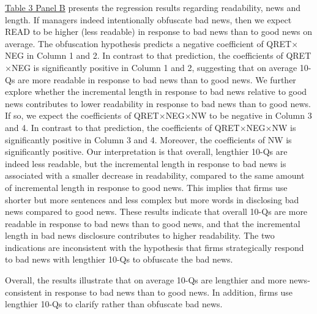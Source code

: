 \documentclass[letterpaper,11pt]{article}
\begin{document}
\begin{spacing}{1.5}
\hyperref[T3PB]{Table 3 Panel B} presents the regression results regarding readability, news and length. If managers indeed intentionally obfuscate bad news, then we expect READ to be higher (less readable) in response to bad news than to good news on average. The obfuscation hypothesis predicts a negative coefficient of QRET$\times$NEG in Column 1 and 2. In contrast to that prediction, the coefficients of QRET$\times$NEG is significantly positive in Column 1 and 2, suggesting that on average 10-Qs are more readable in response to bad news than to good news. We further explore whether the incremental length in response to bad news relative to good news contributes to lower readability in response to bad news than to good news. If so, we expect the coefficients of QRET$\times$NEG$\times$NW to be negative in Column 3 and 4. In contrast to that prediction, the coefficients of QRET$\times$NEG$\times$NW is significantly positive in Column 3 and 4. Moreover, the coefficients of NW is significantly positive. Our interpretation is that overall, lengthier 10-Qs are indeed less readable, but the incremental length in response to bad news is associated with a smaller decrease in readability, compared to the same amount of incremental length in response to good news. This implies that firms use shorter but more sentences and less complex but more words in disclosing bad news compared to good news. These results indicate that overall 10-Qs are more readable in response to bad news than to good news, and that the incremental length in bad news disclosure contributes to higher readability. The two indications are inconsistent with the hypothesis that firms strategically respond to bad news with lengthier 10-Qs to obfuscate the bad news. 

Overall, the results illustrate that on average 10-Qs are lengthier and more news-consistent in response to bad news than to good news. In addition, firms use lengthier 10-Qs to clarify rather than obfuscate bad news.


\end{spacing}
\end{document}
